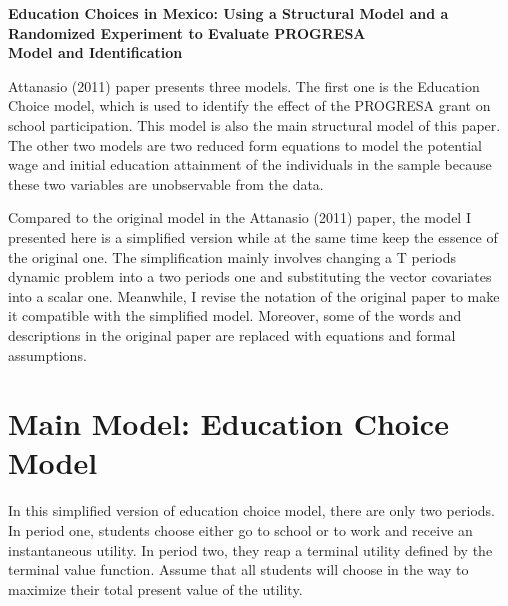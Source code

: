 \documentclass{handoutForSolutions}
\begin{document}
\begin{center}
{ \normalfont \Large \textbf{Education Choices in Mexico:
Using a Structural Model and a Randomized Experiment to Evaluate PROGRESA} }\\
\vspace{3mm}
{ \large \textbf{Model and Identification} }
\end{center}


Attanasio (2011) paper presents three models. The first one is the Education Choice model, which is used to identify the effect of the PROGRESA grant on school participation. This model is also the main structural model of this paper. The other two models are two reduced form equations to model the potential wage and initial education attainment of the individuals in the sample because these two variables are unobservable from the data.

Compared to the original model in the Attanasio (2011) paper, the model I presented here is a simplified version while at the same time keep the essence of the original one. The simplification mainly involves changing a T periods dynamic problem into a two periods one and substituting the vector covariates into a scalar one. Meanwhile, I revise the notation of the original paper to make it compatible with the simplified model. Moreover, some of the words and descriptions in the original paper are replaced with equations and formal assumptions.
\section{Main Model: Education Choice Model}
In this simplified version of education choice model, there are only two periods. In period one, students choose either go to school or to work and receive an instantaneous utility. In period two, they reap a terminal utility defined by the terminal value function. Assume that all students will choose in the way to maximize their total present value of the utility.
\end{document}
